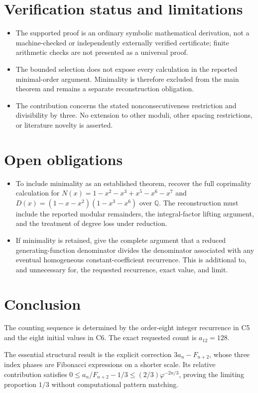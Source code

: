 \documentclass[11pt]{article}
\begin{document}
\section{Verification status and limitations}
\begin{itemize}
\item The supported proof is an ordinary symbolic mathematical derivation, not a machine-checked or independently externally verified certificate; finite arithmetic checks are not presented as a universal proof.
\item The bounded selection does not expose every calculation in the reported minimal-order argument. Minimality is therefore excluded from the main theorem and remains a separate reconstruction obligation.
\item The contribution concerns the stated nonconsecutiveness restriction and divisibility by three. No extension to other moduli, other spacing restrictions, or literature novelty is asserted.
\end{itemize}
\section{Open obligations}
\begin{itemize}
\item To include minimality as an established theorem, recover the full coprimality calculation for $N(x)=1-x^2-x^3+x^5-x^6-x^7$ and $D(x)=(1-x-x^2)(1-x^3-x^6)$ over $\mathbb{Q}$. The reconstruction must include the reported modular remainders, the integral-factor lifting argument, and the treatment of degree loss under reduction.
\item If minimality is retained, give the complete argument that a reduced generating-function denominator divides the denominator associated with any eventual homogeneous constant-coefficient recurrence. This is additional to, and unnecessary for, the requested recurrence, exact value, and limit.
\end{itemize}
\section{Conclusion}
The counting sequence is determined by the order-eight integer recurrence in C5 and the eight initial values in C6. The exact requested count is $a_{12}=128$.

The essential structural result is the explicit correction $3a_n-F_{n+2}$, whose three index phases are Fibonacci expressions on a shorter scale. Its relative contribution satisfies $0\leq a_n/F_{n+2}-1/3\leq (2/3)\varphi^{-2n/3}$, proving the limiting proportion $1/3$ without computational pattern matching.
\end{document}
